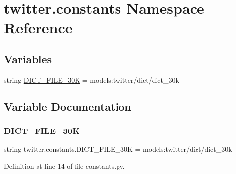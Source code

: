 \hypertarget{namespacetwitter_1_1constants}{}\section{twitter.\+constants Namespace Reference}
\label{namespacetwitter_1_1constants}
\subsection*{Variables}
\begin{DoxyCompactItemize}
\item 
string \hyperlink{namespacetwitter_1_1constants_a2e7fe42bc68e7421c2175b245a6400c4}{D\+I\+C\+T\+\_\+\+F\+I\+L\+E\+\_\+30K} = \textquotesingle{}models\+:twitter/dict/dict\+\_\+30k\textquotesingle{}
\end{DoxyCompactItemize}


\subsection{Variable Documentation}
\mbox{\label{namespacetwitter_1_1constants_a2e7fe42bc68e7421c2175b245a6400c4}} 
\subsubsection{\texorpdfstring{D\+I\+C\+T\+\_\+\+F\+I\+L\+E\+\_\+30K}{DICT\_FILE\_30K}}
{\footnotesize\ttfamily string twitter.\+constants.\+D\+I\+C\+T\+\_\+\+F\+I\+L\+E\+\_\+30K = \textquotesingle{}models\+:twitter/dict/dict\+\_\+30k\textquotesingle{}}



Definition at line 14 of file constants.\+py.

